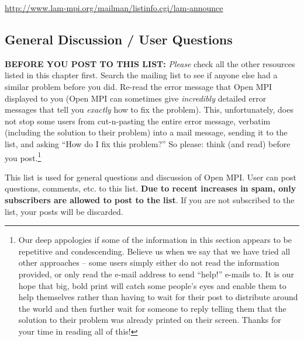 \vspace{11pt}

\centerline{\url{http://www.lam-mpi.org/mailman/listinfo.cgi/lam-announce}}
  
\vspace{11pt}

  

\subsection{General Discussion / User Questions}
  
{\bf BEFORE YOU POST TO THIS LIST:} {\em Please} check all the other
resources listed in this chapter first.  Search the mailing list to
see if anyone else had a similar problem before you did.  Re-read the
error message that Open MPI displayed to you (Open MPI can sometimes give {\em
  incredibly} detailed error messages that tell you {\em exactly} how
to fix the problem).  This, unfortunately, does not stop some users
from cut-n-pasting the entire error message, verbatim (including the
solution to their problem) into a mail message, sending it to the
list, and asking ``How do I fix this problem?''  So please: think (and
read) before you post.\footnote{Our deep appologies if some of the
  information in this section appears to be repetitive and
  condescending.  Believe us when we say that we have tried all other
  approaches -- some users simply either do not read the information
  provided, or only read the e-mail address to send ``help!'' e-mails
  to.  It is our hope that big, bold print will catch some people's
  eyes and enable them to help themselves rather than having to wait
  for their post to distribute around the world and then further wait
  for someone to reply telling them that the solution to their problem
  was already printed on their screen.  Thanks for your time in
  reading all of this!}

\vspace{11pt}
  
This list is used for general questions and discussion of Open MPI.
User can post questions, comments, etc. to this list.  {\bf Due to
  recent increases in spam, only subscribers are allowed to post to
  the list}.  If you are not subscribed to the list, your posts will
be discarded.

